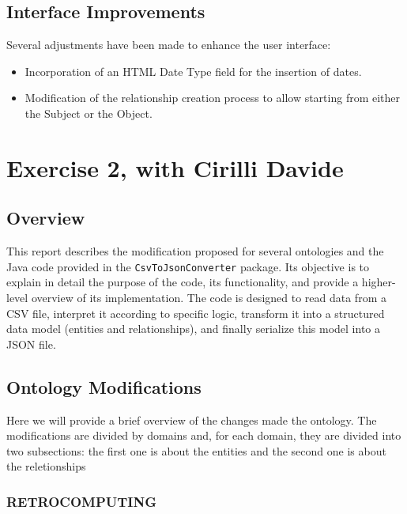 \subsection{Interface Improvements}

Several adjustments have been made to enhance the user interface:

\begin{itemize}
    \item Incorporation of an HTML Date Type field for the insertion of dates.
    \item Modification of the relationship creation process to allow starting from either the Subject or the Object.
\end{itemize}


\section{Exercise 2, with Cirilli Davide}

\subsection{Overview}

This report describes the modification proposed for several ontologies and the Java code provided in the \texttt{CsvToJsonConverter} package. Its objective is to explain in detail the purpose of the code, its functionality, and provide a higher-level overview of its implementation. The code is designed to read data from a CSV file, interpret it according to specific logic, transform it into a structured data model (entities and relationships), and finally serialize this model into a JSON file.


\subsection{Ontology Modifications}


Here we will provide a brief overview of the changes made the ontology. The modifications are divided by domains and, for each domain, they are divided into two subsections: the first one is about the entities and the second one is about the reletionships
\subsubsection{RETROCOMPUTING}

